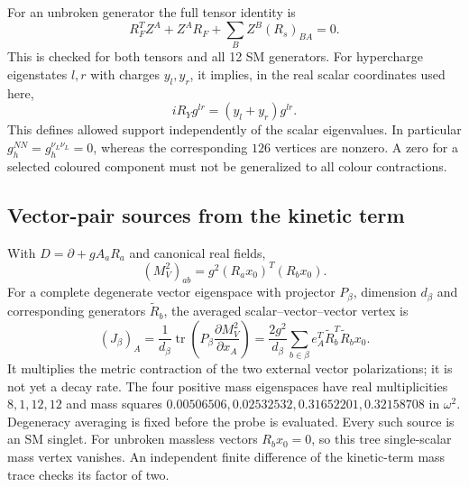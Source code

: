 \documentclass[11pt]{article}
\newcommand{\tr}{\operatorname{tr}}
\begin{document}
For an unbroken generator the full tensor identity is
\begin{equation}
 R_F^T Z^A+Z^A R_F+\sum_B Z^B(R_s)_{BA}=0. \label{eq:ward}
\end{equation}
This is checked for both tensors and all 12 SM generators. For hypercharge
eigenstates $l,r$ with charges $y_l,y_r$, it implies, in the real scalar
coordinates used here,
\begin{equation}
 iR_Y g^{lr}=(y_l+y_r)g^{lr}.
\end{equation}
This defines allowed support independently of the scalar eigenvalues.
In particular $g_h^{NN}=g_h^{\nu_L\nu_L}=0$, whereas the corresponding
$126$ vertices are nonzero. A zero for a selected coloured component
must not be generalized to all colour contractions.

\subsection{Vector-pair sources from the kinetic term}
With $D=\partial+g A_aR_a$ and canonical real fields,
\begin{equation}
 (M_V^2)_{ab}=g^2(R_a x_0)^T(R_b x_0).
\end{equation}
For a complete degenerate vector eigenspace with projector $P_\beta$,
dimension $d_\beta$ and corresponding generators $\widetilde R_b$, the
averaged scalar--vector--vector vertex is
\begin{equation}
 (J_\beta)_A=\frac1{d_\beta}\tr
 \left(P_\beta\frac{\partial M_V^2}{\partial x_A}\right)
 =\frac{2g^2}{d_\beta}\sum_{b\in\beta}
 e_A^T\widetilde R_b^T\widetilde R_bx_0. \label{eq:vv}
\end{equation}
It multiplies the metric contraction of the two external vector
polarizations; it is not yet a decay rate. The four positive mass
eigenspaces have real multiplicities $8,1,12,12$ and mass squares
$0.00506506,0.02532532,0.31652201,0.32158708$ in $\omega^2$.
Degeneracy averaging is fixed before the probe is evaluated. Every such
source is an SM singlet. For unbroken massless vectors $R_bx_0=0$, so
this tree single-scalar mass vertex vanishes. An independent finite
difference of the kinetic-term mass trace checks its factor of two.
\end{document}
